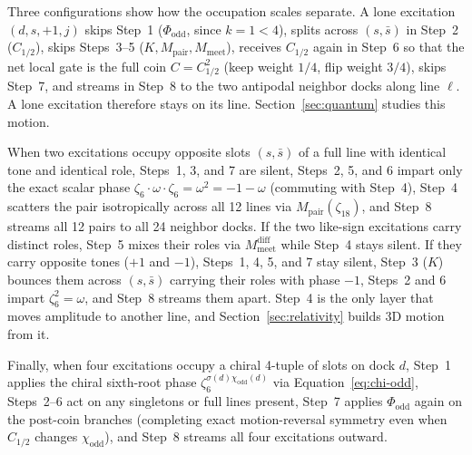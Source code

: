 Three configurations show how the occupation scales separate. A lone excitation $(d, s, +1, j)$ skips Step~1 ($\Phi_{\mathrm{odd}}$, since $k = 1 < 4$), splits across $(s, \bar{s})$ in
Step~2 ($C_{1/2}$), skips Steps~3--5 ($K, M_{\mathrm{pair}}, M_{\mathrm{meet}}$), receives $C_{1/2}$ again in Step~6
so that the net local gate is the full coin $C = C_{1/2}^2$ (keep weight $1/4$, flip weight $3/4$), skips Step~7, and
streams in Step~8 to the two antipodal neighbor docks along line $\ell$. A lone excitation therefore stays on its
line. Section~\ref{sec:quantum} studies this motion.

When two excitations occupy opposite slots $(s, \bar{s})$ of a full line with identical tone and identical role,
Steps~1, 3, and 7 are silent, Steps~2, 5, and 6 impart only the exact scalar phase
$\zeta_6 \cdot \omega \cdot \zeta_6 = \omega^2 = -1 - \omega$ (commuting with Step~4), Step~4 scatters the pair
isotropically across all 12 lines via $M_{\mathrm{pair}}(\zeta_{18})$, and Step~8 streams all 12 pairs to all 24
neighbor docks. If the two like-sign excitations carry distinct roles, Step~5 mixes their roles via
$M_{\mathrm{meet}}^{\mathrm{diff}}$ while Step~4 stays silent. If they carry opposite tones ($+1$ and $-1$), Steps~1,
4, 5, and 7 stay silent, Step~3 ($K$) bounces them across $(s, \bar{s})$ carrying their roles with phase $-1$,
Steps~2 and 6 impart $\zeta_6^2 = \omega$, and Step~8 streams them apart. Step~4 is the only layer that moves
amplitude to another line, and Section~\ref{sec:relativity} builds 3D motion from it.

Finally, when four excitations occupy a chiral 4-tuple of slots on dock $d$, Step~1 applies the chiral sixth-root phase
$\zeta_6^{\sigma(d)\chi_{\mathrm{odd}}(d)}$ via Equation~\eqref{eq:chi-odd}, Steps~2--6 act on any singletons or full
lines present, Step~7 applies $\Phi_{\mathrm{odd}}$ again on the post-coin branches (completing exact motion-reversal
symmetry even when $C_{1/2}$ changes $\chi_{\mathrm{odd}}$), and Step~8 streams all four excitations outward.

